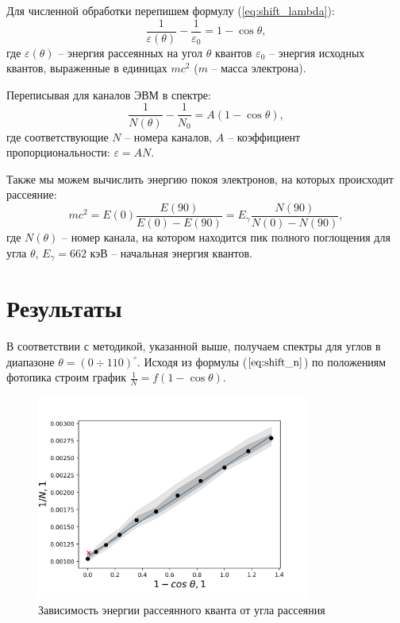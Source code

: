 \documentclass[12pt,a4paper]{article}
\begin{document}
	Для численной обработки перепишем формулу (\ref{eq:shift_lambda}):
	\begin{equation*}
		\frac{1}{\varepsilon(\theta)} - \frac{1}{\varepsilon_0} = 1 - \cos \theta,
		\label{eq:shift_epsilon}
	\end{equation*}
	где $\varepsilon(\theta)$ -- энергия рассеянных на угол $\theta$ квантов $\varepsilon_0$ -- энергия исходных квантов, выраженные в единицах $mc^2$ ($m$ -- масса электрона).
	
	Переписывая для каналов ЭВМ в спектре:
	\begin{equation}
		\frac{1}{N(\theta)} - \frac{1}{N_0} = A (1 - \cos \theta),
		\label{eq:shift_n}
	\end{equation}
	где соответствующие $N$ -- номера каналов, $A$ -- коэффициент пропорциональности: $\varepsilon = A N$.
	
	Также мы можем вычислить энергию покоя электронов, на которых происходит рассеяние:
	\begin{equation}
		mc^2 = E(0) \frac{E(90)}{E(0) - E(90)} = E_{\gamma} \frac{N(90)}{N(0) - N(90)},
	\end{equation}
	где $N(\theta)$ -- номер канала, на котором находится пик полного поглощения для угла $\theta$, $E_{\gamma} = 662$ кэВ -- начальная энергия квантов.

	\section*{Результаты}
		В соответствии с методикой, указанной выше, получаем спектры для углов в диапазоне $\theta = (0 \div 110)^{\circ}$. Исходя из формулы ($\ref{eq:shift_n}$) по положениям фотопика строим график $\frac{1}{N} = f(1 - \cos \theta)$.

		\begin{figure}[h]
			\centering
	        \includegraphics[width=0.8\textwidth]{res/graph.png}
	        \caption{Зависимость энергии рассеянного кванта от угла рассеяния}
		\end{figure}
		
\end{document}
